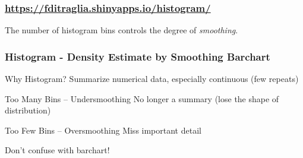 \begin{frame}
	\frametitle{\href{https://fditraglia.shinyapps.io/histogram/}{https://fditraglia.shinyapps.io/histogram/}}

\begin{figure}
\end{figure}

\alert{The number of histogram bins controls the degree of \emph{smoothing}.}

\end{frame}

\begin{frame}
  \frametitle{Histogram - Density Estimate by Smoothing Barchart} 

\begin{block}{Why Histogram?}
Summarize numerical data, especially continuous (few repeats)
\end{block}

\begin{block}{Too Many Bins -- Undersmoothing}
No longer a summary (lose the shape of distribution)
\end{block}

\begin{block}{Too Few Bins -- Oversmoothing}
Miss important detail
\end{block}

\begin{alertblock}{Don't confuse with barchart!}
\end{alertblock}
\end{frame}


